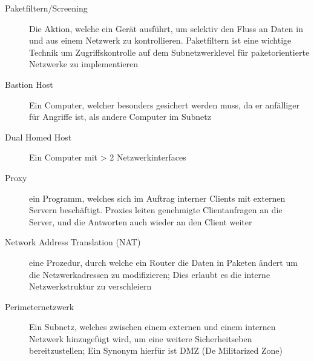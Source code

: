 \documentclass[10pt,landscape]{article}
\begin{document}
\begin{multicols}{3}
\begin{description}
    \item[Paketfiltern/Screening] Die Aktion, welche ein Gerät ausführt, um selektiv den Fluss an Daten in und aus einem Netzwerk zu kontrollieren. Paketfiltern ist eine wichtige Technik um Zugriffskontrolle auf dem Subnetzwerklevel für paketorientierte Netzwerke zu implementieren
    \item[Bastion Host] Ein Computer, welcher besonders gesichert werden muss, da er anfälliger für Angriffe ist, als andere Computer im Subnetz
    \item[Dual Homed Host] Ein Computer mit > 2 Netzwerkinterfaces
    \item[Proxy] ein Programm, welches sich im Auftrag interner Clients mit externen Servern beschäftigt. Proxies leiten genehmigte Clientanfragen an die Server, und die Antworten auch wieder an den Client weiter
    \item[Network Address Translation (NAT)] eine Prozedur, durch welche ein Router die Daten in Paketen ändert um die Netzwerkadressen zu modifizieren; Dies erlaubt es die interne Netzwerkstruktur zu verschleiern
    \item[Perimeternetzwerk] Ein Subnetz, welches zwischen einem externen und einem internen Netzwerk hinzugefügt wird, um eine weitere Sicherheitseben bereitzustellen; Ein Synonym hierfür ist DMZ (De Militarized Zone)

\end{description}

\end{multicols}
\newpage
\end{document}
